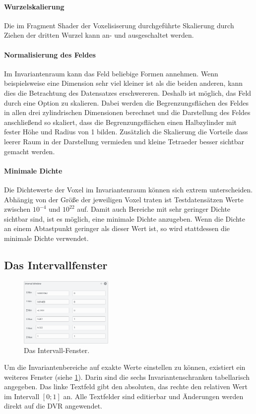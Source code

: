 \documentclass[a4paper,fontsize=12pt,toc=bib,halfparskip,ngerman]{scrartcl}
\begin{document}
\paragraph{Wurzelskalierung}
Die im Fragment Shader der Voxelisiserung durchgef\"uhrte Skalierung durch Ziehen der dritten Wurzel kann an- und ausgeschaltet werden.

\paragraph{Normalisierung des Feldes}
Im Invariantenraum kann das Feld beliebige Formen annehmen. Wenn beispielsweise eine Dimension sehr viel kleiner ist als die beiden anderen, kann dies die Betrachtung des Datensatzes erschwereren. Deshalb ist m\"oglich, das Feld durch eine Option zu skalieren. Dabei werden die Begrenzungsfl\"achen des Feldes in allen drei zylindrischen Dimensionen berechnet und die Darstellung des Feldes anschlie{\ss}end so skaliert, dass die Begrenzungsfl\"achen einen Halbzylinder mit fester H\"ohe und Radius von 1 bilden. Zus\"atzlich die Skalierung die Vorteile dass leerer Raum in der Darstellung vermieden und kleine Tetraeder besser sichtbar gemacht werden.

\paragraph{Minimale Dichte}
Die Dichtewerte der Voxel im Invariantenraum k\"onnen sich extrem unterscheiden. Abh\"angig von der Gr\"o{\ss}e der jeweiligen Voxel traten ist Testdatens\"atzen Werte zwischen $10^{-4}$ und $10^22$ auf. Damit auch Bereiche mit sehr geringer Dichte sichtbar sind, ist es m\"oglich, eine minimale Dichte anzugeben. Wenn die Dichte an einem Abtastpunkt geringer als dieser Wert ist, so wird stattdessen die minimale Dichte verwendet.

\subsection{Das Intervallfenster}
\begin{figure}
	\centering
	\includegraphics[width=0.4\textwidth]{pictures/IntervalWindow.png}
	\caption{Das Intervall-Fenster.}
	\label{IntervalWindow}
\end{figure}
Um die Invariantenbereiche auf exakte Werte einstellen zu k\"onnen, existiert ein weiteres Fenster (siehe \cref{IntervalWindow}). Darin sind die sechs Invariantenschranken tabellarisch angegeben. Das linke Textfeld gibt den absoluten, das rechte den relativen Wert im Intervall $[0;1]$ an. Alle Textfelder sind editierbar und \"Anderungen werden direkt auf die DVR angewendet.
\end{document}
